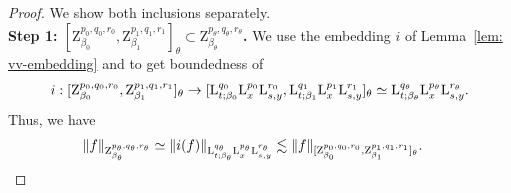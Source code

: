 \documentclass[11pt, leqno,parskip=half]{amsart}
\theoremstyle{definition}
\renewcommand{\L}{\mathrm{L}}
\newcommand{\Z}{\mathrm{Z}}
\numberwithin{equation}{section}
\begin{document}
\begin{proof}
    We show both inclusions separately.\\

    \noindent \textbf{Step 1: $ [\Z^{p_0,q_0,r_0}_{\beta_0} , \Z^{p_1,q_1,r_1}_{\beta_1} ]_{\theta} \subset  \Z^{p_\theta, q_\theta,r_\theta}_{\beta_\theta}$.}
    We use the embedding $i$ of Lemma~\ref{lem: vv-embedding} and \cite[Thm.\@ 14.3.1]{AIB} to get boundedness of
    \begin{align*}
        i: [\Z^{p_0,q_0,r_0}_{\beta_0} , \Z^{p_1,q_1,r_1}_{\beta_1} ]_{\theta}\to [\L^{q_0}_{t;\beta_0}\L^{p_0}_{\vphantom{t;\beta_0}x}\L^{r_0}_{\vphantom{t;\beta_0}s,y} , \L^{q_1}_{t;\beta_1}\L^{p_1}_{\vphantom{t;\beta_0}x}\L^{r_1}_{\vphantom{t;\beta_0}s,y}]_{\theta} \simeq \L^{q_\theta}_{t;\beta_\theta}\L^{p_\theta}_{\vphantom{t;\beta_\theta}x}\L^{r_\theta}_{\vphantom{t;\beta_\theta}s,y}.
    \end{align*}
    Thus, we have
    \begin{align*}
        \|f\|_{\Z^{p_\theta, q_\theta,r_\theta}_{\beta_\theta}} &\simeq \|i(f)\|_{\L^{q_\theta}_{t;\beta_\theta}\L^{p_\theta}_{\vphantom{t;\beta_\theta}x}\L^{r_\theta}_{\vphantom{t;\beta_\theta}s,y}}\lesssim \|f\|_{[\Z^{p_0,q_0,r_0}_{\beta_0} , \Z^{p_1,q_1,r_1}_{\beta_1} ]_{\theta}}.
    \end{align*}


\end{proof}
\end{document}
